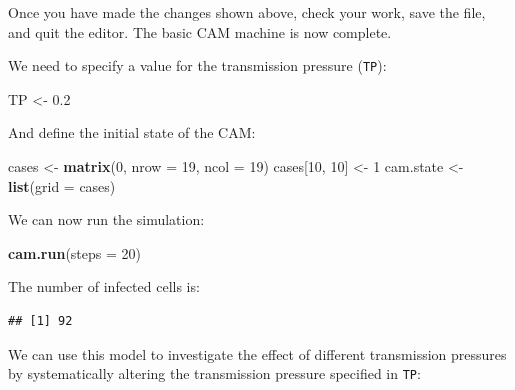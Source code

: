 \documentclass[12pt,a4paper]{book}
\newenvironment{Shaded}{\begin{snugshade}}{\end{snugshade}}
\newcommand{\KeywordTok}[1]{\textcolor[rgb]{0.13,0.29,0.53}{\textbf{#1}}}
\newcommand{\DataTypeTok}[1]{\textcolor[rgb]{0.13,0.29,0.53}{#1}}
\newcommand{\DecValTok}[1]{\textcolor[rgb]{0.00,0.00,0.81}{#1}}
\newcommand{\FloatTok}[1]{\textcolor[rgb]{0.00,0.00,0.81}{#1}}
\newcommand{\StringTok}[1]{\textcolor[rgb]{0.31,0.60,0.02}{#1}}
\newcommand{\OperatorTok}[1]{\textcolor[rgb]{0.81,0.36,0.00}{\textbf{#1}}}
\newcommand{\NormalTok}[1]{#1}
\theoremstyle{definition}
\theoremstyle{definition}
\theoremstyle{definition}
\theoremstyle{remark}
\begin{document}
Once you have made the changes shown above, check your work, save the
file, and quit the editor. The basic CAM machine is now complete.

We need to specify a value for the transmission pressure (\texttt{TP}):

\begin{Shaded}
\begin{Highlighting}[]
\NormalTok{TP <-}\StringTok{ }\FloatTok{0.2}
\end{Highlighting}
\end{Shaded}

And define the initial state of the CAM:

\begin{Shaded}
\begin{Highlighting}[]
\NormalTok{cases <-}\StringTok{ }\KeywordTok{matrix}\NormalTok{(}\DecValTok{0}\NormalTok{, }\DataTypeTok{nrow =} \DecValTok{19}\NormalTok{, }\DataTypeTok{ncol =} \DecValTok{19}\NormalTok{)}
\NormalTok{cases[}\DecValTok{10}\NormalTok{, }\DecValTok{10}\NormalTok{] <-}\StringTok{ }\DecValTok{1}
\NormalTok{cam.state <-}\StringTok{ }\KeywordTok{list}\NormalTok{(}\DataTypeTok{grid =}\NormalTok{ cases)}
\end{Highlighting}
\end{Shaded}

We can now run the simulation:

\begin{Shaded}
\begin{Highlighting}[]
\KeywordTok{cam.run}\NormalTok{(}\DataTypeTok{steps =} \DecValTok{20}\NormalTok{)}
\end{Highlighting}
\end{Shaded}

The number of infected cells is:

\begin{Shaded}
\end{Shaded}

\begin{verbatim}
## [1] 92
\end{verbatim}

We can use this model to investigate the effect of different
transmission pressures by systematically altering the transmission
pressure specified in \texttt{TP}:
\end{document}
